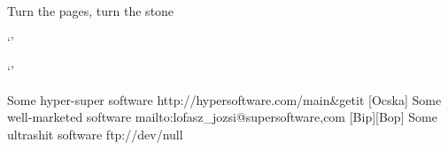 
Turn the pages, turn the stone
\newpage


`'


`'

\newpage

\Keyword{}

\Target{}

\newpage
\Link{}

\newpage

\begin{Progliography}
	{Some hyper-super software}
	{http://hypersoftware.com/main&getit}
[Ocska]
	{Some well-marketed software}
	{mailto:lofasz_jozsi@supersoftware,com}
[Bip][Bop]
	{Some ultrashit software}
	{ftp://dev/null}
\end{Progliography}
